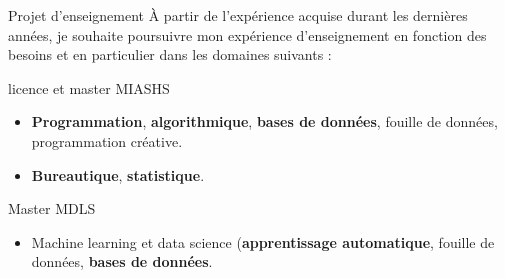 \begin{frame}{Projet d'enseignement}
À partir de l'expérience acquise durant les dernières années, je souhaite poursuivre mon expérience d’enseignement en fonction des besoins et en particulier dans les domaines  suivants :
\begin{block}{licence et master MIASHS}
\begin{itemize}
\item \textbf{Programmation}, \textbf{algorithmique}, \textbf{bases de données}, fouille de données, programmation créative.
\item \textbf{Bureautique}, \textbf{statistique}.  
\end{itemize}
\end{block}
	
\begin{block}{Master MDLS}
\begin{itemize}
\item Machine learning et data science (\textbf{apprentissage automatique}, fouille de données, \textbf{bases de données}.
\end{itemize}
\end{block}


\end{frame}

